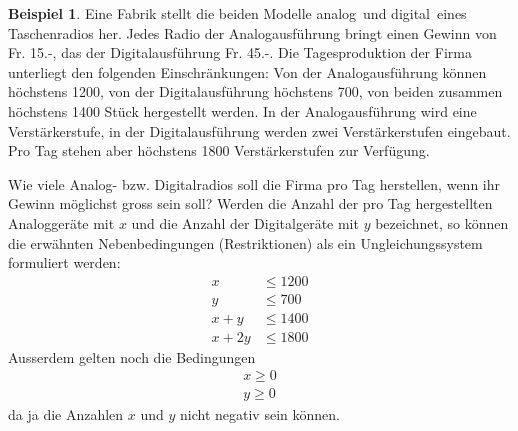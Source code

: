 \documentclass[%
11pt,%
twoside,%
titlepage,%
swissgerman,%
headsepline%
]{scrartcl}
\theoremstyle{definition}
\newtheorem{bsp}{Beispiel}[subsection] %
\theoremstyle{plain}
\begin{document}
		\begin{bsp}
			Eine Fabrik stellt die beiden Modelle \glqq analog\grqq\ und \glqq digital\grqq\ eines Taschenradios her. Jedes Radio der Analogausführung bringt einen Gewinn von Fr. 15.-, das der Digitalausführung Fr. 45.-.
			Die Tagesproduktion der Firma unterliegt den folgenden Einschränkungen: Von der Analogausführung können höchstens 1200, von der Digitalausführung höchstens 700, von beiden zusammen höchstens 1400 Stück hergestellt werden. In der Analogausführung wird eine Verstärkerstufe, in der Digitalausführung werden zwei Verstärkerstufen eingebaut. Pro Tag stehen aber höchstens 1800 Verstärkerstufen zur Verfügung.
			
			Wie viele Analog- bzw. Digitalradios soll die Firma pro Tag herstellen, wenn ihr Gewinn möglichst gross sein soll?
			Werden die Anzahl der pro Tag hergestellten Analoggeräte mit $x$ und die Anzahl der Digitalgeräte mit $y$ bezeichnet, so können die erwähnten Nebenbedingungen (Restriktionen) als ein Ungleichungssystem formuliert werden:
			\begin{align}
				x&\leq1200\\
				y&\leq700\\
				x+y&\leq1400\\
				x+2y&\leq1800
			\end{align}
			Ausserdem gelten noch die Bedingungen
			\begin{align*}
				x\geq0\\
				y\geq0
			\end{align*}
			da ja die Anzahlen $x$ und $y$ nicht negativ sein können.
			

\end{bsp}
\end{document}
